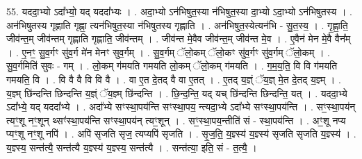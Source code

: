 \documentclass[17pt]{extarticle}
\begin{document}
55. यददा॒भ्यो ऽदा᳚भ्यो॒ यद् यददा᳚भ्यः । . अदा॒भ्यो ऽन॑भिषुत॒स्या न॑भिषुत॒स्या दा॒भ्यो ऽदा॒भ्यो ऽन॑भिषुतस्य । . अन॑भिषुतस्य गृह्णाति गृह्णा॒ त्यन॑भिषुत॒स्या न॑भिषुतस्य गृह्णाति । . अन॑भिषुत॒स्येत्यन॑भि - सु॒त॒स्य॒ । . गृ॒ह्णा॒ति॒ जीव॑न्त॒म् जीव॑न्तम् गृह्णाति गृह्णाति॒ जीव॑न्तम् । . जीव॑न्त मे॒वैव जीव॑न्त॒म् जीव॑न्त मे॒व । . ए॒वैन॑ मेन मे॒वै वैन᳚म् । . ए॒नꣳ॒॒ सु॒व॒र्गꣳ सु॑व॒र्ग मे॑न मेनꣳ सुव॒र्गम् । . सु॒व॒र्गम् ॅलो॒कम् ॅलो॒कꣳ सु॑व॒र्गꣳ सु॑व॒र्गम् ॅलो॒कम् । . सु॒व॒र्गमिति॑ सुवः - गम् । . लो॒कम् ग॑मयति गमयति लो॒कम् ॅलो॒कम् ग॑मयति । . ग॒म॒य॒ति॒ वि वि ग॑मयति गमयति॒ वि । . वि वै वै वि वि वै । . वा ए॒त दे॒तद् वै वा ए॒तत् । . ए॒तद् य॒ज्ञ्ं ॅय॒ज्ञ् मे॒त दे॒तद् य॒ज्ञ्म् । . य॒ज्ञ्म् छि॑न्दन्ति छिन्दन्ति य॒ज्ञ्ं ॅय॒ज्ञ्म् छि॑न्दन्ति । . छि॒न्द॒न्ति॒ यद् यच् छि॑न्दन्ति छिन्दन्ति॒ यत् । . यददा॒भ्ये ऽदा᳚भ्ये॒ यद् यददा᳚भ्ये । . अदा᳚भ्ये सꣳस्था॒पय॑न्ति सꣳस्था॒पय॒ न्त्यदा॒भ्ये ऽदा᳚भ्ये सꣳस्था॒पय॑न्ति । . सꣳ॒॒स्था॒पय॑न् त्यꣳ॒॒शू नꣳ॒॒शून् थ्सꣳ॑स्था॒पय॑न्ति सꣳस्था॒पय॑न् त्यꣳ॒॒शून् । . सꣳ॒॒स्था॒पय॒न्तीति॑ सं - स्था॒पय॑न्ति । . अꣳ॒॒शू नप्य प्यꣳ॒॒शू नꣳ॒॒शू नपि॑ । . अपि॑ सृजति सृज॒ त्यप्यपि॑ सृजति । . सृ॒ज॒ति॒ य॒ज्ञ्स्य॑ य॒ज्ञ्स्य॑ सृजति सृजति य॒ज्ञ्स्य॑ । . य॒ज्ञ्स्य॒ सन्त॑त्यै॒ सन्त॑त्यै य॒ज्ञ्स्य॑ य॒ज्ञ्स्य॒ सन्त॑त्यै । . सन्त॑त्या॒ इति॒ सं - त॒त्यै॒ । \newline
\end{document}
